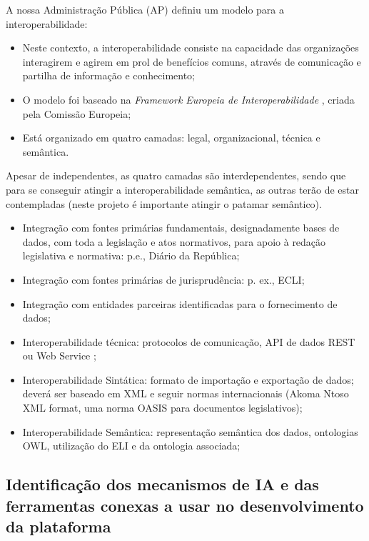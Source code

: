 A nossa Administração Pública (AP) definiu um modelo para a interoperabilidade:
\begin{itemize}
\item Neste contexto, a interoperabilidade consiste na capacidade das organizações interagirem 
e agirem em prol de benefícios comuns, através de comunicação e partilha de informação e conhecimento;
\item O modelo foi baseado na \emph{Framework Europeia de Interoperabilidade} \cite{EIF}, criada pela Comissão Europeia;
\item Está organizado em quatro camadas: legal, organizacional, técnica e semântica.
\end{itemize}

Apesar de independentes, as quatro camadas são interdependentes, sendo que para se conseguir atingir a interoperabilidade 
semântica, as outras terão de estar contempladas (neste projeto é importante atingir o patamar semântico).

\begin{itemize}
\item Integração com fontes primárias fundamentais, designadamente bases de dados, com toda a
legislação e atos normativos, para apoio à redação legislativa e normativa: p.e., Diário da
República;
\item Integração com fontes primárias de jurisprudência: p. ex., ECLI;
\item Integração com entidades parceiras identificadas para o fornecimento de dados;
\item Interoperabilidade técnica: protocolos de comunicação, API de dados REST ou Web Service ;
\item Interoperabilidade Sintática: formato de importação e exportação de dados; deverá ser baseado
em XML e seguir normas internacionais (Akoma Ntoso XML format, uma norma OASIS para
documentos legislativos);
\item Interoperabilidade Semântica: representação semântica dos dados, ontologias OWL, utilização
do ELI e da ontologia associada;
\end{itemize}

\subsection{Identificação dos mecanismos de IA e das ferramentas conexas a usar no desenvolvimento
da plataforma}


